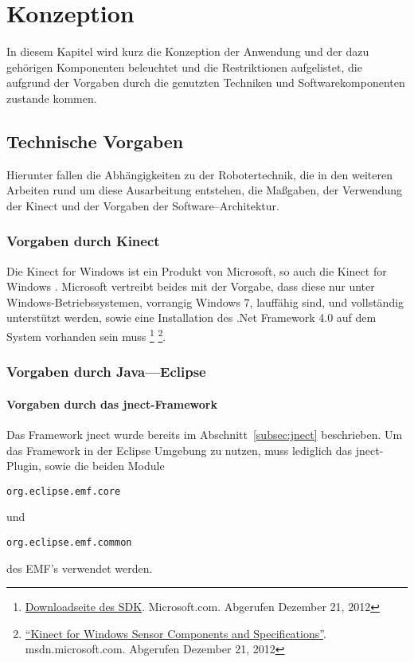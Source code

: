\chapter{Konzeption}
\label{chap:Konzeption}

In diesem Kapitel wird kurz die Konzeption der Anwendung und der dazu geh\"origen Komponenten beleuchtet und die Restriktionen aufgelistet, die aufgrund der Vorgaben durch die genutzten Techniken und Softwarekomponenten zustande kommen.

\section{Technische Vorgaben}
Hierunter fallen die Abh\"angigkeiten zu der Robotertechnik, die in den weiteren Arbeiten rund um diese Ausarbeitung entstehen, die Ma\ss gaben, der Verwendung der Kinect und der Vorgaben der Software--Architektur.

\subsection{Vorgaben durch Kinect}
Die Kinect for Windows ist ein Produkt von Microsoft, so auch die Kinect for Windows . Microsoft vertreibt beides mit der Vorgabe, dass diese nur unter Windows-Betriebssystemen, vorrangig Windows 7, lauff\"ahig sind, und vollst\"andig unterst\"utzt werden, sowie eine Installation des .Net Framework 4.0 auf dem System vorhanden sein muss \footnote{\href{https://www.microsoft.com/en-us/kinectforwindows/develop/}{Downloadseite des SDK}. Microsoft.com. Abgerufen Dezember 21, 2012} \footnote{\href{http://msdn.microsoft.com/en-us/library/jj131033.aspx}{\enquote{Kinect for Windows Sensor Components and Specifications}}. msdn.microsoft.com. Abgerufen Dezember 21, 2012}.

\subsection{Vorgaben durch Java---Eclipse}
\label{subsec:vorgabeJava}

\subsubsection{Vorgaben durch das jnect-Framework}
Das Framework jnect wurde bereits im Abschnitt~\ref{subsec:jnect} beschrieben. Um das \gls{Framework} in der Eclipse Umgebung zu nutzen, muss lediglich das jnect-Plugin, sowie die beiden Module
 \begin{verbatim}org.eclipse.emf.core\end{verbatim}
und 
\begin{verbatim}org.eclipse.emf.common\end{verbatim} 
des \gls{EMF}'s verwendet werden.

